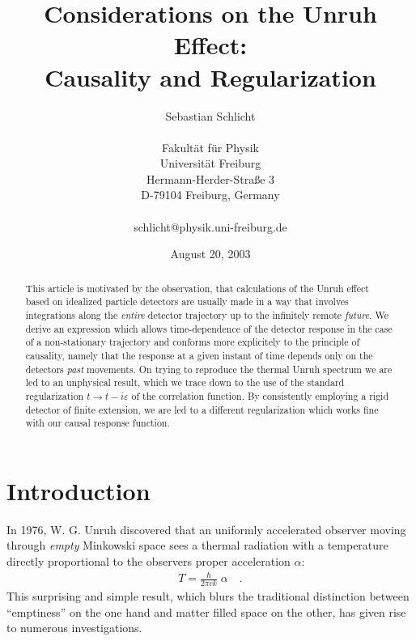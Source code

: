 \documentclass[a4paper,12pt]{article}
\newcommand{\eps}{\varepsilon}
\begin{document}
\title{Considerations on the Unruh Effect:\\ Causality and Regularization}


\author{Sebastian Schlicht    \\
   \mbox{}                                     \\
\normalsize{Fakult\"at f\"ur Physik}           \\
\normalsize{Universit\"at Freiburg}            \\
\normalsize{Hermann-Herder-Straße 3}          \\
\normalsize{D-79104 Freiburg, Germany}         \\
   \mbox{}                                     \\
{\small schlicht@physik.uni-freiburg.de}        \\
}

\date{August 20, 2003}

\maketitle


\begin{abstract}
\noindent
This article is motivated by the observation, that calculations of the Unruh effect
based on idealized particle detectors are usually made in a way that 
involves integrations along the {\em entire} detector trajectory up to the infinitely 
remote {\em future}.
We derive an expression which allows time-dependence of the detector response
in the case of a non-stationary trajectory
and conforms more explicitely to the principle of causality, namely that the response
at a given instant of time depends only on the detectors {\em past} movements.
On trying to reproduce the thermal Unruh spectrum we are led to an unphysical result,
which we trace down to the use of the standard regularization $t\to t-i\eps$ of the
correlation function. 
By consistently employing a rigid detector of finite extension, we are led to a different
regularization which works fine with our causal response function.
\end{abstract}


\newpage

\section{Introduction}


In 1976, W. G. Unruh \cite{unr} discovered that an uniformly accelerated observer moving 
through {\em empty} Minkowski space sees a thermal radiation with a temperature directly 
proportional to the observers proper acceleration $\alpha$:
\begin{eqnarray*}
T=\frac{\hbar}{2\pi ck}\;\alpha\quad.
\end{eqnarray*}
This surprising and simple result, which blurs the traditional distinction between 
``emptiness'' on the one hand and matter filled space on the other, has given rise to
numerous investigations.
\end{document}
